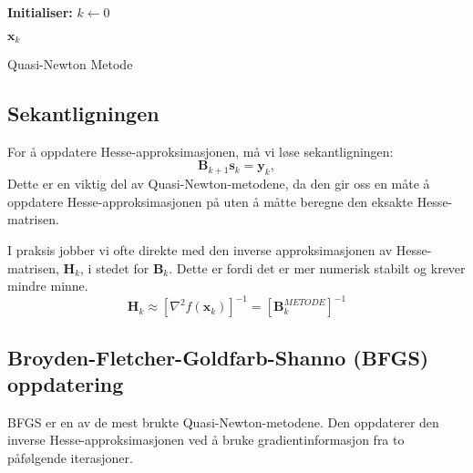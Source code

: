 \begin{algorithm}[H]
	\DontPrintSemicolon

	\textbf{Initialiser:} \( k \gets 0 \)\;

	\Return \( \mathbf{x}_k \)\;
	\caption{Quasi-Newton Metode}
	\label{alg:quasi_newton}
\end{algorithm}

\subsection{Sekantligningen}
For å oppdatere Hesse-approksimasjonen, må vi løse sekantligningen:
\[
	\symbf{B}_{k+1}\symbf{s}_k = \symbf{y}_k,
\]
Dette er en viktig del av Quasi-Newton-metodene, da den gir oss en måte å oppdatere Hesse-approksimasjonen på uten å måtte beregne den eksakte Hesse-matrisen.

I praksis jobber vi ofte direkte med den inverse approksimasjonen av Hesse-matrisen, \(\symbf{H}_k\), i stedet for \(\symbf{B}_k\). Dette er fordi det er mer numerisk stabilt og krever mindre minne.
\[
	\symbf{H}_k \approx [\nabla^2 f(\symbf{x}_k)]^{-1} =[\symbf{B}_k^{METODE}]^{-1}
\]

\subsection{Broyden-Fletcher-Goldfarb-Shanno (BFGS) oppdatering}
BFGS er en av de mest brukte Quasi-Newton-metodene.
Den oppdaterer den inverse Hesse-approksimasjonen ved å bruke gradientinformasjon fra to påfølgende iterasjoner.

